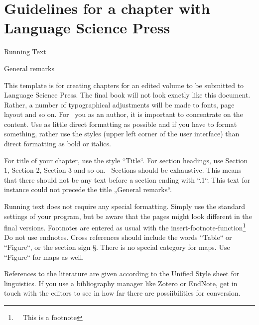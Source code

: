 
\section{Guidelines for a chapter with Language Science Press}
\begin{styleHeadingi}
Running Text
\end{styleHeadingi}

\begin{styleHeadingii}
General remarks
\end{styleHeadingii}

\begin{styleTextbody}
This template is for creating chapters for an edited volume to be submitted to Language Science Press. The final book will not look exactly like this document. Rather, a number of typographical adjustments will be made to fonts, page layout and so on. For \ you as an author, it is important to concentrate on the content. Use as little direct formatting as possible and if you have to format something, rather use the styles (upper left corner of the user interface) than direct formatting as bold or italics. \ 
\end{styleTextbody}

\begin{styleTextbody}
For title of your chapter, use the style “Title“. For section headings, use Section 1, Section 2, Section 3 and so on. \ Sections should be exhaustive. This means that there should not be any text before a section ending with “.1“. This text for instance could not precede the title „General remarks“. 
\end{styleTextbody}

\begin{styleTextbody}
Running text does not require any special formatting. Simply use the standard settings of your program, but be aware that the pages might look different in the final versions. Footnotes are entered as usual with the insert-footnote-function\footnote{\ \ This is a footnote} Do not use endnotes. Cross references should include the words “Table“ or “Figure“, or the section sign §. There is no special category for maps. Use “Figure“ for maps as well. 
\end{styleTextbody}

\begin{styleTextbody}
References to the literature are given according to the Unified Style sheet for linguistics. If you use a bibliography manager like Zotero or EndNote, get in touch with the editors to see in how far there are possiibilities for conversion. 
\end{styleTextbody}

